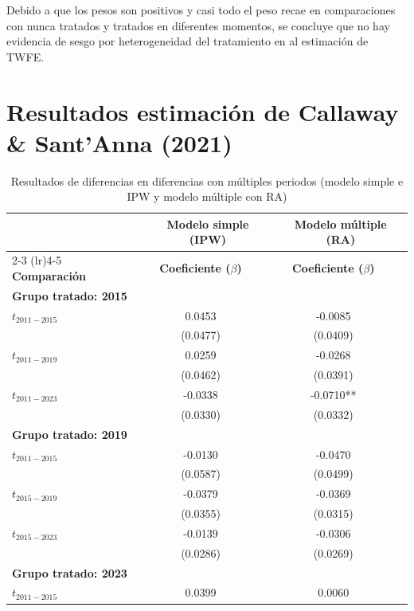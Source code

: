 \documentclass{article}
\begin{document}
Debido a que los pesos son positivos y casi todo el peso recae en comparaciones con nunca tratados y tratados en diferentes momentos, se concluye que no hay evidencia de sesgo por heterogeneidad del tratamiento en al estimación de TWFE.


\section{Resultados estimación de Callaway \& Sant'Anna (2021)}
\label{sec:resultados_callaway_santanna}

\begin{table}[H]
\centering
\caption{Resultados de diferencias en diferencias con múltiples periodos (modelo simple e IPW y modelo múltiple con RA)}
\label{tab:did_multiple_simple}
\begin{tabular}{lcccc}
\hline
\hline
 & \multicolumn{2}{c}{\textbf{Modelo simple (IPW)}} & \multicolumn{2}{c}{\textbf{Modelo múltiple (RA)}} \\
\cmidrule(lr){2-3} \cmidrule(lr){4-5}
\textbf{Comparación} & \textbf{Coeficiente ($\beta$)} & & \textbf{Coeficiente ($\beta$)} & \\
\hline
\multicolumn{5}{l}{\textbf{Grupo tratado: 2015}} \\
\hline
$t_{2011-2015}$ & 0.0453 &  & -0.0085 &  \\
                 & (0.0477) &  & (0.0409) &  \\
$t_{2011-2019}$ & 0.0259 &  & -0.0268 &  \\
                 & (0.0462) &  & (0.0391) &  \\
$t_{2011-2023}$ & -0.0338 &  & -0.0710** &  \\
                 & (0.0330) &  & (0.0332) &  \\
\hline
\multicolumn{5}{l}{\textbf{Grupo tratado: 2019}} \\
\hline
$t_{2011-2015}$ & -0.0130 &  & -0.0470 &  \\
                 & (0.0587) &  & (0.0499) &  \\
$t_{2015-2019}$ & -0.0379 &  & -0.0369 &  \\
                 & (0.0355) &  & (0.0315) &  \\
$t_{2015-2023}$ & -0.0139 &  & -0.0306 &  \\
                 & (0.0286) &  & (0.0269) &  \\
\hline
\multicolumn{5}{l}{\textbf{Grupo tratado: 2023}} \\
\hline
$t_{2011-2015}$ & 0.0399 &  & 0.0060 &  \\

\end{tabular}
\end{table}
\end{document}
